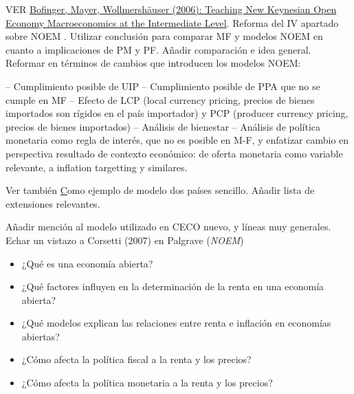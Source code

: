 \documentclass{nuevotema}
\begin{document}
	
\ideaclave

VER \href{https://www.econstor.eu/bitstream/10419/22359/1/wep66.pdf}{Bofinger, Mayer, Wollmershäuser (2006): Teaching New Keynesian Open Economy Macroeconomics at the Intermediate Level}. Reforma del IV apartado sobre NOEM . Utilizar conclusión para comparar MF y modelos NOEM en cuanto a implicaciones de PM y PF. Añadir comparación e idea general. Reformar en términos de cambios que introducen los modelos NOEM:

-- Cumplimiento posible de UIP 
-- Cumplimiento posible de PPA que no se cumple en MF
-- Efecto de LCP (local currency pricing, precios de bienes importados son rígidos en el país importador) y PCP (producer currency pricing, precios de bienes importados)
-- Análisis de bienestar
-- Análisis de política monetaria como regla de interés, que no es posible en M-F, y enfatizar cambio en perspectiva resultado de contexto económico: de oferta monetaria como variable relevante, a inflation targetting y similares. 

Ver también \href{http://repositorio.ipea.gov.br/bitstream/11058/4943/1/DiscussionPaper_164.pdf} Como ejemplo de modelo dos países sencillo. Añadir lista de extensiones relevantes. 

Añadir mención al modelo utilizado en CECO nuevo, y líneas muy generales. Echar un vistazo a Corsetti (2007) en Palgrave (\textit{NOEM})


\begin{itemize}
	\item ¿Qué es una economía abierta?
	\item ¿Qué factores influyen en la determinación de la renta en una economía abierta?
	\item ¿Qué modelos explican las relaciones entre renta e inflación en economías abiertas?
	\item ¿Cómo afecta la política fiscal a la renta y los precios?
	\item ¿Cómo afecta la política monetaria a la renta y los precios?
\end{itemize}

\esquemacorto
\end{document}

